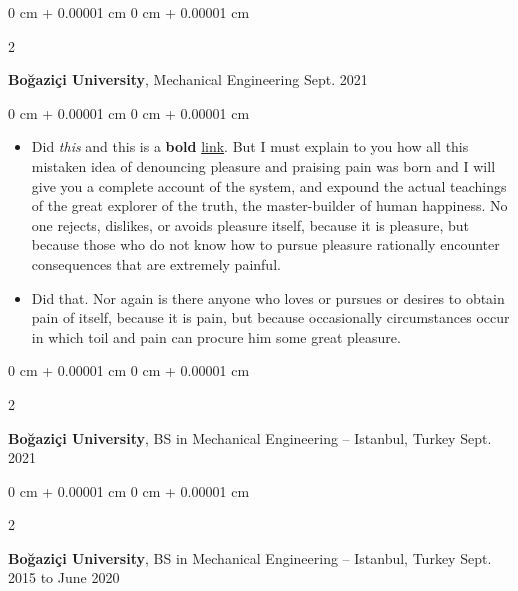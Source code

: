 \documentclass[10pt, letterpaper]{article}
\newenvironment{highlights}{
    \begin{itemize}[
        topsep=0.10 cm,
        parsep=0.10 cm,
        partopsep=0pt,
        itemsep=0pt,
        leftmargin=0 cm + 10pt
    ]
}{
    \end{itemize}
} %
\newenvironment{onecolentry}{
    \begin{adjustwidth}{
        0 cm + 0.00001 cm
    }{
        0 cm + 0.00001 cm
    }
}{
    \end{adjustwidth}
} %
\newenvironment{twocolentry}[2][]{
    \onecolentry
    \def\secondColumn{#2}
    \setcolumnwidth{\fill, 4.5 cm}
    \begin{paracol}{2}
}{
    \switchcolumn \raggedleft \secondColumn
    \end{paracol}
    \endonecolentry
} %
\begin{document}
        \vspace{0.2 cm}

        \begin{twocolentry}{
            Sept. 2021
        }
            \textbf{Boğaziçi University}, Mechanical Engineering\end{twocolentry}

        \vspace{0.10 cm}
        \begin{onecolentry}
            \begin{highlights}
                \item Did \textit{this} and this is a \textbf{bold} \href{https://example.com}{link}. But I must explain to you how all this mistaken idea of denouncing pleasure and praising pain was born and I will give you a complete account of the system, and expound the actual teachings of the great explorer of the truth, the master-builder of human happiness. No one rejects, dislikes, or avoids pleasure itself, because it is pleasure, but because those who do not know how to pursue pleasure rationally encounter consequences that are extremely painful.
                \item Did that. Nor again is there anyone who loves or pursues or desires to obtain pain of itself, because it is pain, but because occasionally circumstances occur in which toil and pain can procure him some great pleasure.
            \end{highlights}
        \end{onecolentry}


        \vspace{0.2 cm}

        \begin{twocolentry}{
            Sept. 2021
        }
            \textbf{Boğaziçi University}, BS in Mechanical Engineering -- Istanbul, Turkey\end{twocolentry}



        \vspace{0.2 cm}

        \begin{twocolentry}{
            Sept. 2015 to June 2020
        }
            \textbf{Boğaziçi University}, BS in Mechanical Engineering -- Istanbul, Turkey\end{twocolentry}
\end{document}
